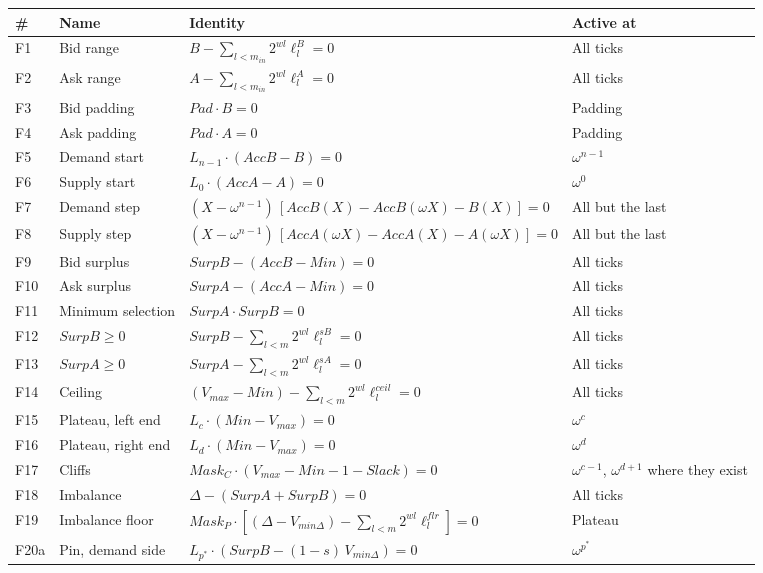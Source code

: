 \begin{longtable}[]{@{}llll@{}}
\toprule\noalign{}
\# & Name & Identity & Active at \\
\midrule\noalign{}
\endhead
\bottomrule\noalign{}
\endlastfoot
F1 & Bid range & \(B - \sum_{l<m_{in}} 2^{wl} \ell^{B}_l = 0\) & All ticks \\
F2 & Ask range & \(A - \sum_{l<m_{in}} 2^{wl} \ell^{A}_l = 0\) & All ticks \\
F3 & Bid padding & \(Pad \cdot B = 0\) & Padding \\
F4 & Ask padding & \(Pad \cdot A = 0\) & Padding \\
F5 & Demand start & \(L_{n-1} \cdot (AccB - B) = 0\) & \(\omega^{n-1}\) \\
F6 & Supply start & \(L_0 \cdot (AccA - A) = 0\) & \(\omega^0\) \\
F7 & Demand step & \((X - \omega^{n-1})\,[AccB(X) - AccB(\omega X) - B(X)] = 0\) & All but the last \\
F8 & Supply step & \((X - \omega^{n-1})\,[AccA(\omega X) - AccA(X) - A(\omega X)] = 0\) & All but the last \\
F9 & Bid surplus & \(SurpB - (AccB - Min) = 0\) & All ticks \\
F10 & Ask surplus & \(SurpA - (AccA - Min) = 0\) & All ticks \\
F11 & Minimum selection & \(SurpA \cdot SurpB = 0\) & All ticks \\
F12 & \(SurpB \ge 0\) & \(SurpB - \sum_{l<m} 2^{wl} \ell^{sB}_l = 0\) & All ticks \\
F13 & \(SurpA \ge 0\) & \(SurpA - \sum_{l<m} 2^{wl} \ell^{sA}_l = 0\) & All ticks \\
F14 & Ceiling & \((V_{max} - Min) - \sum_{l<m} 2^{wl} \ell^{ceil}_l = 0\) & All ticks \\
F15 & Plateau, left end & \(L_c \cdot (Min - V_{max}) = 0\) & \(\omega^c\) \\
F16 & Plateau, right end & \(L_d \cdot (Min - V_{max}) = 0\) & \(\omega^d\) \\
F17 & Cliffs & \(Mask_C \cdot (V_{max} - Min - 1 - Slack) = 0\) & \(\omega^{c-1}\), \(\omega^{d+1}\) where they exist \\
F18 & Imbalance & \(\Delta - (SurpA + SurpB) = 0\) & All ticks \\
F19 & Imbalance floor & \(Mask_P \cdot [(\Delta - V_{min\Delta}) - \sum_{l<m} 2^{wl} \ell^{flr}_l] = 0\) & Plateau \\
F20a & Pin, demand side & \(L_{p^*} \cdot (SurpB - (1-s)\,V_{min\Delta}) = 0\) & \(\omega^{p^*}\) \\

\end{longtable}
